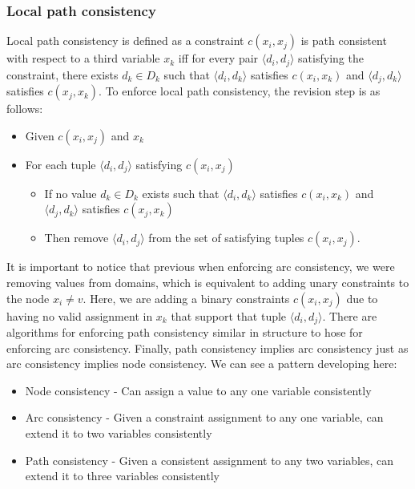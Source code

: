\documentclass[CS4402-Notes.tex]{subfiles}
\begin{document}
\subsubsection{Local path consistency}
Local path consistency is defined as a constraint $c(x_i, x_j)$ is path consistent with respect to a third variable $x_k$ iff for every pair $\langle d_i, d_j \rangle$ satisfying the constraint, there exists $d_k \in D_k$ such that $\langle d_i, d_k \rangle$ satisfies $c(x_i, x_k)$ and $\langle d_j, d_k \rangle$ satisfies $c(x_j, x_k)$.
\n
To enforce local path consistency, the revision step is as follows:
\begin{itemize}
\item Given $c(x_i, x_j)$ and $x_k$
\item For each tuple $\langle d_i, d_j \rangle$ satisfying $c(x_i, x_j)$
  \begin{itemize}
  \item If no value $d_k \in D_k$ exists such that $\langle d_i, d_k \rangle$ satisfies $c(x_i, x_k)$ and $\langle d_j, d_k \rangle$ satisfies $c(x_j, x_k)$
  \item Then remove $\langle d_i, d_j \rangle$ from the set of satisfying tuples $c(x_i, x_j)$.
  \end{itemize}
\end{itemize}
It is important to notice that previous when enforcing arc consistency, we were removing values from domains, which is equivalent to adding unary constraints to the node $x_i \neq v$. Here, we are adding a binary constraints $c(x_i, x_j)$ due to having no valid assignment in $x_k$ that support that tuple $\langle d_i, d_j \rangle$.
\n
There are algorithms for enforcing path consistency similar in structure to hose for enforcing arc consistency. Finally, path consistency implies arc consistency just as arc consistency implies node consistency. We can see a pattern developing here:
\begin{itemize}
\item Node consistency - Can assign a value to any one variable consistently
\item Arc consistency - Given a constraint assignment to any one variable, can extend it to two variables consistently
\item Path consistency - Given a consistent assignment to any two variables, can extend it to three variables consistently
\end{itemize}
\end{document}
